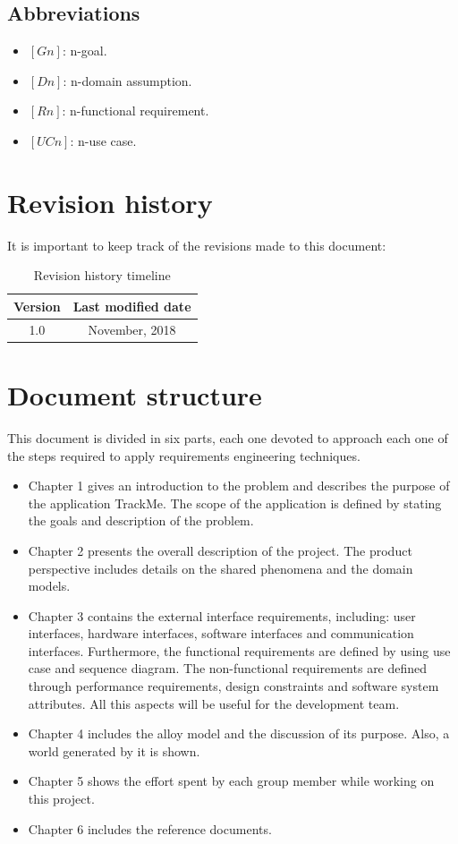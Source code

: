 \documentclass[a4paper, hidelinks, 12pt]{report}
\begin{document}
	\subsection{Abbreviations}
	\begin{itemize}
		\item $[Gn]$: n-goal.
		\item $[Dn]$: n-domain assumption.
		\item $[Rn]$: n-functional requirement.
		\item $[UCn]$: n-use case.
	\end{itemize}
	
	\section{Revision history}
	It is important to keep track of the revisions made to this document: \\
	
	\begin{table}[h]
		\centering
		\begin{tabular}{c c}
			\hline\hline
			\textbf{Version} & \textbf{Last modified date} \\ [0.5ex]
			\hline
			1.0 &  \nth{11} November, 2018  \\
			\hline
		\end{tabular}
		\caption{Revision history timeline}
		\label{fig:Revision history}
	\end{table}
	
	\section{Document structure}
	This document is divided in six parts, each one devoted to approach each one of the steps required to apply requirements engineering techniques.
	\begin{itemize}
		\item Chapter 1 gives an introduction to the problem and describes the purpose of the application TrackMe. The scope of the application is defined by stating the goals and description of the problem.
		\item Chapter 2 presents the overall description of the project. The product perspective includes details on the shared phenomena and the domain models.
		\item Chapter 3 contains the external interface requirements, including: user interfaces, hardware interfaces, software interfaces and communication interfaces. Furthermore, the functional requirements are defined by using use case and sequence diagram. The non-functional requirements are defined through performance requirements, design constraints and software system attributes. All this aspects will be useful for the development team.
		\item Chapter 4 includes the alloy model and the discussion of its purpose. Also, a world generated by it is shown.
		\item Chapter 5 shows the effort spent by each group member while working on this project.
		\item Chapter 6 includes the reference documents.
	\end{itemize}
	
\end{document}
